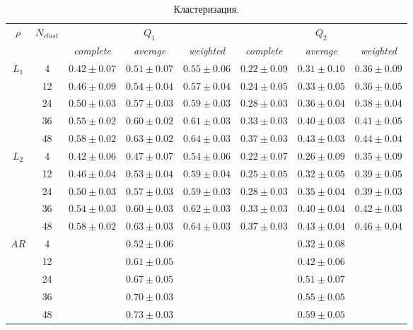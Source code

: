 \documentclass[12pt,twoside]{article}
\begin{document}
        \begin{table}[h]
            \centering
            \begin{tabular}{c|c *{2}{|*{3}{c}}}
                \toprule
                 &  &  &  \\
                \cmidrule(r){3-8}
                && \textit{complete} & \textit{average} & \textit{weighted} & \textit{complete} & \textit{average} & \textit{weighted} \\
                \midrule
                    &  4 & $0.42\pm 0.07$ & $0.51\pm 0.07$ & $0.55\pm 0.06$ & $0.22\pm 0.09$ & $0.31\pm 0.10$ & $0.36\pm 0.09$ \\
                    & 12 & $0.46\pm 0.09$ & $0.54\pm 0.04$ & $0.57\pm 0.04$ & $0.24\pm 0.05$ & $0.33\pm 0.05$ & $0.36\pm 0.05$ \\
                    & 24 & $0.50\pm 0.03$ & $0.57\pm 0.03$ & $0.59\pm 0.03$ & $0.28\pm 0.03$ & $0.36\pm 0.04$ & $0.38\pm 0.04$ \\
                    & 36 & $0.55\pm 0.02$ & $0.60\pm 0.02$ & $0.61\pm 0.03$ & $0.33\pm 0.03$ & $0.40\pm 0.03$ & $0.41\pm 0.05$ \\
                    & 48 & $0.58\pm 0.02$ & $0.63\pm 0.02$ & $0.64\pm 0.03$ & $0.37\pm 0.03$ & $0.43\pm 0.03$ & $0.44\pm 0.04$ \\
            \midrule
                    &  4 & $0.42\pm 0.06$ & $0.47\pm 0.07$ & $0.54\pm 0.06$ & $0.22\pm 0.07$ & $0.26\pm 0.09$ & $0.35\pm 0.09$\\
                    & 12 & $0.46\pm 0.04$ & $0.53\pm 0.04$ & $0.59\pm 0.04$ & $0.25\pm 0.05$ & $0.32\pm 0.05$ & $0.39\pm 0.05$ \\
                    & 24 & $0.50\pm 0.03$ & $0.57\pm 0.03$ & $0.59\pm 0.03$ & $0.28\pm 0.03$ & $0.35\pm 0.04$ & $0.39\pm 0.03$ \\
                    & 36 & $0.54\pm 0.03$ & $0.60\pm 0.03$ & $0.62\pm 0.03$ & $0.33\pm 0.03$ & $0.40\pm 0.04$ & $0.42\pm 0.03$ \\
                    & 48 & $0.58\pm 0.02$ & $0.63\pm 0.03$ & $0.64\pm 0.03$ & $0.37\pm 0.03$ & $0.43\pm 0.04$ & $0.46\pm 0.04$ \\
            \midrule
                    &  4 &  & \\
                    & 12 &  &  \\
                    & 24 &  &  \\
                    & 36 &  &  \\
                    & 48 &  &  \\
            \bottomrule
            \end{tabular}
            \caption{Кластеризация.}
        \end{table}
\end{document}

